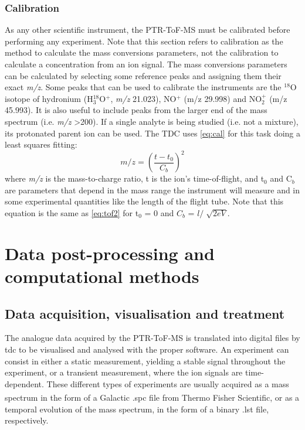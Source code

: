 \subsubsection{Calibration}
As any other scientific instrument, the PTR-ToF-MS must be calibrated before performing any experiment. Note that  this section  refers to calibration as the method to calculate the mass conversions parameters, not the calibration to calculate a concentration from an ion signal. The mass conversions parameters can be calculated by selecting some reference peaks and assigning them their exact \textit{m/z}.
Some peaks that can be used to calibrate the instruments are the $^{18}$O isotope of hydronium (H$_3^{18}$O$^+$, \textit{m/z} 21.023), NO$^{+}$ (m/z 29.998) and  NO$_2^{+}$ (m/z 45.993). 
%
It is also useful to include peaks from the larger end of the mass spectrum (i.e. \textit{m/z} >200). If a single analyte is being studied (i.e. not a mixture), its protonated parent ion can be used.
%
The TDC uses \autoref{eq:cal} for this task doing a least squares fitting:
%
\begin{equation}
\label{eq:cal}
m\slash z =  \left(\frac{t-t_0}{C_b}\right)^2
\end{equation}
where \textit{m/z} is the mass-to-charge ratio, t is the ion's time-of-flight, and t$_0$ and C$_b$ are parameters that depend in the mass range the instrument will measure and in some experimental quantities like the length of the flight tube. Note that this equation is the same as \autoref{eq:tof2} for t$_0$ = 0 and $C_b$ = $l/\sqrt[]{2eV}$.



\section{Data post-processing and computational methods}







\subsection{Data acquisition, visualisation and treatment}

The analogue data acquired by the PTR-ToF-MS is translated into digital files by \acrshort{tdc} to be visualised and analysed  with the proper software. An experiment can consist in either a static measurement, yielding a stable signal throughout the experiment, or a transient measurement, where the ion signals are time-dependent. These different types of experiments are usually acquired as a mass spectrum  in the form of a Galactic .spc  file from Thermo Fisher Scientific\textsuperscript{\textregistered}, or as a temporal evolution of the mass spectrum, in the form of a binary .lst file, respectively.

